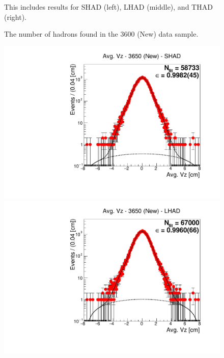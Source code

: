 \begin{figure}[H]
\caption{The number of hadrons found in the 3600 (New) data sample.}
{This includes results for SHAD (left), LHAD (middle), and THAD (right).}
\label{fig:hadron_fits_3600_new}
\end{figure}


\begin{figure}[H]
\centering
\includegraphics[scale=0.25]{figures/plots/nonDDbar_fit_results/3650_new/fit_new_3650_data_SHAD.pdf}
\hspace{-0.5cm}
\includegraphics[scale=0.25]{figures/plots/nonDDbar_fit_results/3650_new/fit_new_3650_data_LHAD.pdf}
\hspace{-0.5cm}

\end{figure}
